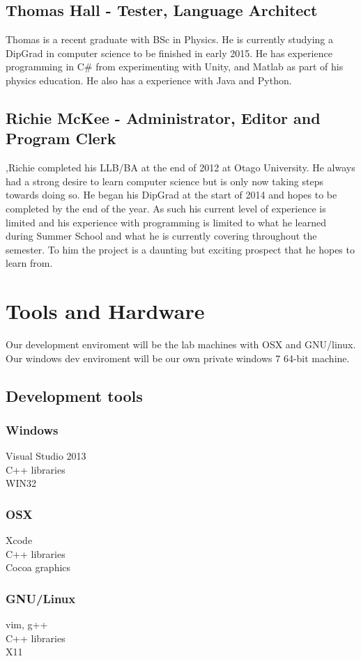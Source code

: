 \documentclass[a4paper,12pt]{article}
\begin{document}
\subsection*{Thomas Hall - \small Tester, Language Architect}
Thomas is a recent graduate with BSc in Physics. He is currently studying a DipGrad in computer science to be finished in early 2015. He has experience programming in C\# from experimenting with Unity, and Matlab as part of his physics education. He also has a experience with Java and Python.

\subsection*{Richie McKee - \small Administrator, Editor and Program Clerk}
,Richie completed his LLB/BA at the end of 2012 at Otago University. He always had a strong desire to learn computer science but is only now taking steps towards doing so. He began his DipGrad at the start of 2014 and hopes to be completed by the end of the year. As such his current level of experience is limited and his experience with programming is limited to what he learned during Summer School and what he is currently covering throughout the semester. To him the project is a daunting but exciting prospect that he hopes to learn from.

\pagebreak
\section*{Tools and Hardware}

Our development enviroment will be the lab machines with OSX and GNU/linux.
Our windows dev enviroment will be our own private windows 7 64-bit machine.
\subsection*{Development tools}
\begin{multicols}{3}
  \subsubsection*{Windows}
  Visual Studio 2013 \\
  C++ libraries \\
  WIN32 \columnbreak
  \subsubsection*{OSX}
  Xcode \\
  C++ libraries \\
  Cocoa graphics \columnbreak
  \subsubsection*{GNU/Linux}
  vim, g++ \\
  C++ libraries \\
  X11
\end{multicols}
\end{document}
